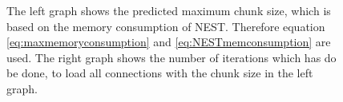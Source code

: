 \documentclass[a4paper]{article}
\begin{document}
\begin{figure}[h!]
\centering
{}

\caption{The left graph shows the predicted maximum chunk size, which is based on the memory consumption of NEST. Therefore equation \ref{eq:maxmemoryconsumption} and \ref{eq:NESTmemconsumption} are used.
	 The right graph shows the number of iterations which has do be done, to load all connections with the chunk size in the left graph.}
\label{fig:ca}
\end{figure}
\end{document}
